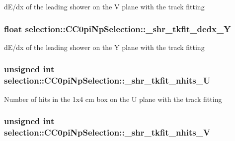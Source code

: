 d\-E/dx of the leading shower on the V plane with the track fitting \hypertarget{classselection_1_1CC0piNpSelection_ababbbc32babdef645c2edc613713ceb7}{
\subsubsection[{\-\_\-shr\-\_\-tkfit\-\_\-dedx\-\_\-\-Y}]{\setlength{\rightskip}{0pt plus 5cm}float selection\-::\-C\-C0pi\-Np\-Selection\-::\-\_\-shr\-\_\-tkfit\-\_\-dedx\-\_\-\-Y\hspace{0.3cm}{\ttfamily [private]}}}\label{classselection_1_1CC0piNpSelection_ababbbc32babdef645c2edc613713ceb7}
d\-E/dx of the leading shower on the Y plane with the track fitting \hypertarget{classselection_1_1CC0piNpSelection_a6c75f5783174133ce97849f128f3dee3}{
\subsubsection[{\-\_\-shr\-\_\-tkfit\-\_\-nhits\-\_\-\-U}]{\setlength{\rightskip}{0pt plus 5cm}unsigned int selection\-::\-C\-C0pi\-Np\-Selection\-::\-\_\-shr\-\_\-tkfit\-\_\-nhits\-\_\-\-U\hspace{0.3cm}{\ttfamily [private]}}}\label{classselection_1_1CC0piNpSelection_a6c75f5783174133ce97849f128f3dee3}
Number of hits in the 1x4 cm box on the U plane with the track fitting \hypertarget{classselection_1_1CC0piNpSelection_adab23c54dd799cdf83c31a10e4ae9061}{
\subsubsection[{\-\_\-shr\-\_\-tkfit\-\_\-nhits\-\_\-\-V}]{\setlength{\rightskip}{0pt plus 5cm}unsigned int selection\-::\-C\-C0pi\-Np\-Selection\-::\-\_\-shr\-\_\-tkfit\-\_\-nhits\-\_\-\-V\hspace{0.3cm}{\ttfamily [private]}}}\label{classselection_1_1CC0piNpSelection_adab23c54dd799cdf83c31a10e4ae9061}
